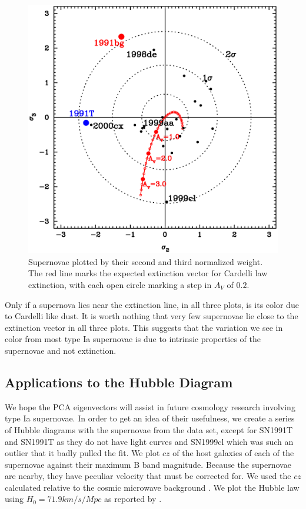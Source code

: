 \begin{figure}[ht]
\begin{center}
\includegraphics[angle=0,scale=0.8]{./figures/pca/sigma2_vs_sigma3_areanorm.ps}
\end{center}
\caption{
Supernovae plotted by their second and third normalized weight. The red line marks the expected extinction vector for Cardelli law extinction, with each open circle marking a step in $A_{V}$ of $0.2$.
}
\label{fig:sig2sig3}
\end{figure}

Only if a supernova lies near the extinction line, in all three plots, is its color due to Cardelli like dust. It is worth nothing that very few supernovae lie close to the extinction vector in all three plots. This suggests that the variation we see in color from most type Ia supernovae is due to intrinsic properties of the supernovae and not extinction.

\clearpage
\subsection{Applications to the Hubble Diagram}
We hope the PCA eigenvectors will assist in future cosmology research involving type Ia supernovae. In order to get an idea of their usefulness, we create a series of Hubble diagrams with the supernovae from the data set, except for SN1991T and SN1991T as they do not have light curves and SN1999cl which was such an outlier that it badly pulled the fit. We plot $cz$ of the host galaxies of each of the supernovae against their maximum B band magnitude. Because the supernovae are nearby, they have peculiar velocity that must be corrected for. We used the $cz$ calculated relative to the cosmic microwave background \citep{fixsen96a}. We plot the Hubble law using $H_{0} = 71.9 km/s/Mpc$ as reported by \citet{hinshaw08a}.

